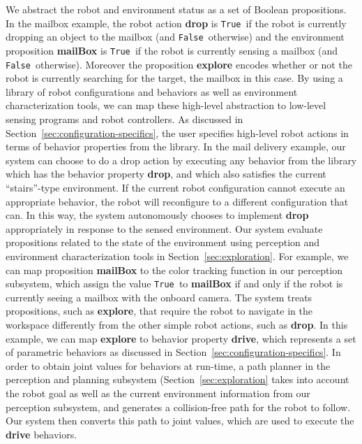 \documentclass[journal]{IEEEtran}
\newcommand{\lt}{{\tt True }}
\newcommand{\lf}{{\tt False }}
\begin{document}
We abstract the robot and environment status as a set of Boolean propositions.
In the mailbox example, the robot action \textbf{drop} is \lt if the robot is currently dropping an object to the mailbox (and \lf otherwise) and the environment proposition \textbf{mailBox} is \lt if the robot is currently sensing a mailbox (and \lf otherwise).
Moreover the proposition \textbf{explore} encodes whether or not the robot is currently searching for the target, the mailbox in this case.
By using a library of robot configurations and behaviors as well as environment characterization tools, we can map these high-level abstraction to low-level sensing programs and robot controllers.
As discussed in Section~\ref{sec:configuration-specifics}, the user specifies high-level robot actions in terms of behavior properties from the library. 
In the mail delivery example, our system can choose to do a drop action by executing any behavior from the library which has the behavior property \textbf{drop}, and which also satisfies the current ``stairs''-type environment. If the current robot configuration cannot execute an appropriate behavior, the robot will reconfigure to a different configuration that can.  In this way, the system autonomously chooses to implement  \textbf{drop}  appropriately in response to the sensed environment.
Our system evaluate propositions related to the state of the environment using perception and environment characterization tools in Section~\ref{sec:exploration}. For example, we can map proposition \textbf{mailBox} to the color tracking function in our perception subsystem, which assign the value \lt to \textbf{mailBox} if and only if the robot is currently seeing a mailbox with the onboard camera.
The system treats propositions, such as \textbf{explore}, that require the robot to navigate in the workspace differently from the other simple robot actions, such as \textbf{drop}.
In this example, we can map \textbf{explore} to behavior property \textbf{drive}, which represents a set of parametric behaviors as discussed in Section~\ref{sec:configuration-specifics}.
In order to obtain joint values for behaviors at run-time, a path planner in the perception and planning subsystem (Section~\ref{sec:exploration} takes into account the robot goal as well as the current environment information from  our perception subsystem, and generates a collision-free path for the robot to follow.
Our system then converts this path to joint values, which are used to execute the \textbf{drive} behaviors.
\end{document}
